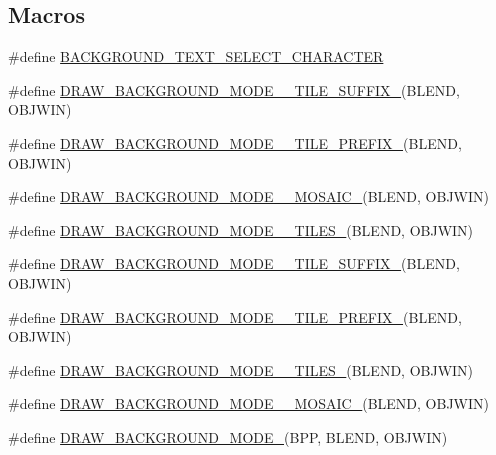 \subsection*{Macros}
\begin{DoxyCompactItemize}
\item 
\#define \mbox{\hyperlink{software-mode0_8c_a81ef9dd218c0b78163b655d61b0edb94}{B\+A\+C\+K\+G\+R\+O\+U\+N\+D\+\_\+\+T\+E\+X\+T\+\_\+\+S\+E\+L\+E\+C\+T\+\_\+\+C\+H\+A\+R\+A\+C\+T\+ER}}
\item 
\#define \mbox{\hyperlink{software-mode0_8c_a87f2ad1608705428548eb03e8ed11194}{D\+R\+A\+W\+\_\+\+B\+A\+C\+K\+G\+R\+O\+U\+N\+D\+\_\+\+M\+O\+D\+E\+\_\+\_\+\+T\+I\+L\+E\+\_\+\+S\+U\+F\+F\+I\+X\+\_}}(B\+L\+E\+ND,  O\+B\+J\+W\+IN)
\item 
\#define \mbox{\hyperlink{software-mode0_8c_ae44c4d75a60ee6293921b72c7ba43d89}{D\+R\+A\+W\+\_\+\+B\+A\+C\+K\+G\+R\+O\+U\+N\+D\+\_\+\+M\+O\+D\+E\+\_\+\_\+\+T\+I\+L\+E\+\_\+\+P\+R\+E\+F\+I\+X\+\_}}(B\+L\+E\+ND,  O\+B\+J\+W\+IN)
\item 
\#define \mbox{\hyperlink{software-mode0_8c_a4919086cda52c574d8f29f01797d6a4f}{D\+R\+A\+W\+\_\+\+B\+A\+C\+K\+G\+R\+O\+U\+N\+D\+\_\+\+M\+O\+D\+E\+\_\+\_\+\+M\+O\+S\+A\+I\+C\+\_}}(B\+L\+E\+ND,  O\+B\+J\+W\+IN)
\item 
\#define \mbox{\hyperlink{software-mode0_8c_ab2f5569ef06185a741711d4273fe993c}{D\+R\+A\+W\+\_\+\+B\+A\+C\+K\+G\+R\+O\+U\+N\+D\+\_\+\+M\+O\+D\+E\+\_\+\_\+\+T\+I\+L\+E\+S\+\_}}(B\+L\+E\+ND,  O\+B\+J\+W\+IN)
\item 
\#define \mbox{\hyperlink{software-mode0_8c_ac9efee9d62a467359f1f44b406fd2ee9}{D\+R\+A\+W\+\_\+\+B\+A\+C\+K\+G\+R\+O\+U\+N\+D\+\_\+\+M\+O\+D\+E\+\_\+\_\+\+T\+I\+L\+E\+\_\+\+S\+U\+F\+F\+I\+X\+\_}}(B\+L\+E\+ND,  O\+B\+J\+W\+IN)
\item 
\#define \mbox{\hyperlink{software-mode0_8c_a8d6e496bcecd9afb58313191690b7a61}{D\+R\+A\+W\+\_\+\+B\+A\+C\+K\+G\+R\+O\+U\+N\+D\+\_\+\+M\+O\+D\+E\+\_\+\_\+\+T\+I\+L\+E\+\_\+\+P\+R\+E\+F\+I\+X\+\_}}(B\+L\+E\+ND,  O\+B\+J\+W\+IN)
\item 
\#define \mbox{\hyperlink{software-mode0_8c_a1f656520069a3c48c676fb09c8cb43cd}{D\+R\+A\+W\+\_\+\+B\+A\+C\+K\+G\+R\+O\+U\+N\+D\+\_\+\+M\+O\+D\+E\+\_\+\_\+\+T\+I\+L\+E\+S\+\_}}(B\+L\+E\+ND,  O\+B\+J\+W\+IN)
\item 
\#define \mbox{\hyperlink{software-mode0_8c_ab8263fc92dea7cce980f4d77410c19fa}{D\+R\+A\+W\+\_\+\+B\+A\+C\+K\+G\+R\+O\+U\+N\+D\+\_\+\+M\+O\+D\+E\+\_\+\_\+\+M\+O\+S\+A\+I\+C\+\_}}(B\+L\+E\+ND,  O\+B\+J\+W\+IN)
\item 
\#define \mbox{\hyperlink{software-mode0_8c_a5f4b00b153673d229da521c59005f7c8}{D\+R\+A\+W\+\_\+\+B\+A\+C\+K\+G\+R\+O\+U\+N\+D\+\_\+\+M\+O\+D\+E\+\_}}(B\+PP,  B\+L\+E\+ND,  O\+B\+J\+W\+IN)
\end{DoxyCompactItemize}
